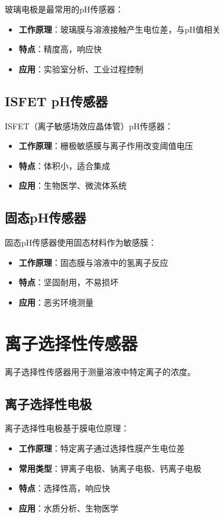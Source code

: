 \documentclass[12pt,UTF8]{ctexbook}
\begin{document}
玻璃电极是最常用的pH传感器：

\begin{itemize}[leftmargin=2cm]
	\item \textbf{工作原理}：玻璃膜与溶液接触产生电位差，与pH值相关
	\item \textbf{特点}：精度高，响应快
	\item \textbf{应用}：实验室分析、工业过程控制
\end{itemize}

\subsection{ISFET pH传感器}

ISFET（离子敏感场效应晶体管）pH传感器：

\begin{itemize}[leftmargin=2cm]
	\item \textbf{工作原理}：栅极敏感膜与离子作用改变阈值电压
	\item \textbf{特点}：体积小，适合集成
	\item \textbf{应用}：生物医学、微流体系统
\end{itemize}

\subsection{固态pH传感器}

固态pH传感器使用固态材料作为敏感膜：

\begin{itemize}[leftmargin=2cm]
	\item \textbf{工作原理}：固态膜与溶液中的氢离子反应
	\item \textbf{特点}：坚固耐用，不易损坏
	\item \textbf{应用}：恶劣环境测量
\end{itemize}

\section{离子选择性传感器}

离子选择性传感器用于测量溶液中特定离子的浓度。

\subsection{离子选择性电极}

离子选择性电极基于膜电位原理：

\begin{itemize}[leftmargin=2cm]
	\item \textbf{工作原理}：特定离子通过选择性膜产生电位差
	\item \textbf{常用类型}：钾离子电极、钠离子电极、钙离子电极
	\item \textbf{特点}：选择性高，响应快
	\item \textbf{应用}：水质分析、生物医学
\end{itemize}
\end{document}
